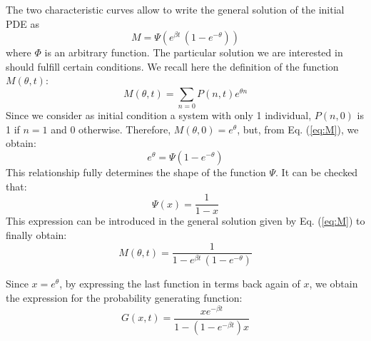 The two characteristic curves allow to write the general solution of the initial PDE as
\begin{equation}
\label{eq:M}
M = \Psi ( e^{\beta t} \, (1 - e^{-\theta}) )
\end{equation}
where $\Phi$ is an arbitrary function. The particular solution we are interested in should fulfill certain conditions. We recall here the definition of the function $M(\theta,t)$:
\begin{equation}
M(\theta, t) = \sum_{n=0} P(n,t) e^{\theta n}
\end{equation}
Since we consider as initial condition a system with only 1 individual, $P(n,0)$ is 1 if $n=1$ and 0 otherwise. Therefore, $M(\theta,0) = e^\theta$, but, from Eq. (\ref{eq:M}), we obtain:
\begin{equation}
	e^{\theta} = \Psi( 1 - e^{-\theta} )
\end{equation}
This relationship fully determines the shape of the function $\Psi$. It can be checked that:
\begin{equation}
	\Psi(x) = \frac{1}{1-x}
\end{equation}
This expression can be introduced in the general solution given by Eq. (\ref{eq:M}) to finally obtain:
\begin{equation}
	M(\theta,t) = \frac{1}{1 - e^{\beta t} \, (1 - e^{-\theta})}
\end{equation}

Since $x=e^{\theta}$, by expressing the last function in terms back again of $x$, we obtain the expression for the probability generating function:
\begin{equation}
	G(x,t) = \frac{x e^{-\beta t}}{1 - ( 1 - e^{-\beta t} )x}
\end{equation}
